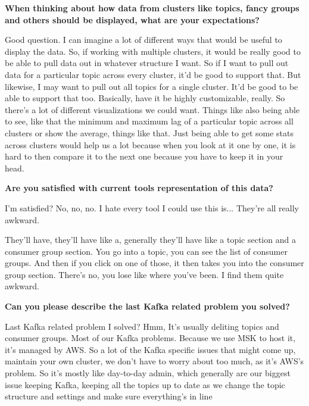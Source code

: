 \textbf{When thinking about how data from clusters like topics, fancy groups and others should be displayed, what are your expectations?}

Good question. I can imagine a lot of different ways that would be useful to display the data. So, if working with multiple clusters, it would be really good to be able to pull data out in whatever structure I want. So if I want to pull out data for a particular topic across every cluster, it'd be good to support that. But likewise, I may want to pull out all topics for a single cluster. It'd be good to be able to support that too. Basically, have it be highly customizable, really. So there's a lot of different visualizations we could want. Things like also being able to see, like that the minimum and maximum lag of a particular topic across all clusters or show the average, things like that. Just being able to get some stats across clusters would help us a lot because when you look at it one by one, it is hard to then compare it to the next one because you have to keep it in your head.

\textbf{Are you satisfied with current tools representation of this data? } 

I'm satisfied? No, no, no. I hate every tool I could use this is... They're all really awkward.

They'll have, they'll have like a, generally they'll have like a topic section and a consumer group section. You go into a topic, you can see the list of consumer groups. And then if you click on one of those, it then takes you into the consumer group section. There's no, you lose like where you've been. I find them quite awkward.

\textbf{Can you please describe the last Kafka related problem you solved?}

Last Kafka related problem I solved? Hmm, It's usually deliting topics and consumer groups. Most of our Kafka problems. Because we use MSK to host it, it's managed by AWS. So a lot of the Kafka specific issues that might come up, maintain your own cluster, we don't have to worry about too much, as it's AWS's problem. So it's mostly like day-to-day admin, which generally are our biggest issue keeping Kafka, keeping all the topics up to date as we change the topic structure and settings and make sure everything's in line 



